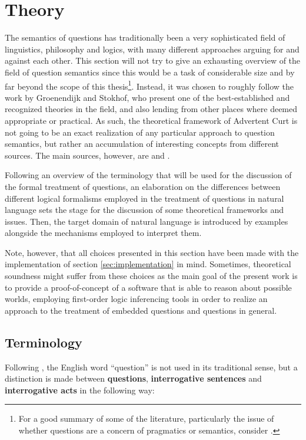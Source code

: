 \documentclass[a4paper]{article}
\newcommand{\term}[1]{\textsf{\textbf{#1}}} %
\newcommand{\pn}{\textsf} %
\newcommand{\acurt}{\pn{Advertent Curt}}
\theoremstyle{remark}
\theoremstyle{remark}
\theoremstyle{definition}
\theoremstyle{definition}
\begin{document}
\section{Theory}\label{sec:theory}

The semantics of questions has traditionally been a very sophisticated field of
linguistics,  philosophy and logics, with many different approaches arguing for
and against each other. This section will not try to give an exhausting overview
of the field of question semantics since this would be a task of considerable
size and by far beyond the scope of this thesis\footnote{For a good summary of
some of the literature, particularly the issue of whether questions are a
concern of pragmatics or semantics, consider \cite[section 2 and 3]{gs:q}.}.
Instead, it was chosen to roughly follow the work by Groenendijk and Stokhof,
who present one of the best-established and recognized theories in the field,
and also lending from other places where deemed appropriate or practical. As
such, the theoretical framework of \acurt{} is not going to be an exact
realization of any particular approach to question semantics, but rather an
accumulation of interesting concepts from different sources. The main sources,
however, are \cite{gs:q} and \cite{gs:sqpa}.

Following an overview of the terminology that will be used for the discussion of
the formal treatment of questions, an  elaboration on the differences between
different logical formalisms employed in the treatment of questions in natural
language sets the stage for the discussion of some theoretical frameworks and
issues. Then, the target domain of natural language is introduced by examples
alongside the mechanisms employed to interpret them. 

Note, however, that all choices presented in this section have been made
with the implementation of section \ref{sec:implementation} in mind.
Sometimes, theoretical soundness might suffer from these choices as the main
goal of the present work is to provide a proof-of-concept of a software that is
able to reason about possible worlds, employing first-order logic inferencing
tools in order to realize an approach to the treatment of embedded questions and
questions in general.

\subsection{Terminology}

Following \cite{gs:q}, the English word ``question'' is not used in its
traditional sense, but a distinction is made between \term{questions},
\term{interrogative sentences} and \term{interrogative acts} in the following
way:
\end{document}
